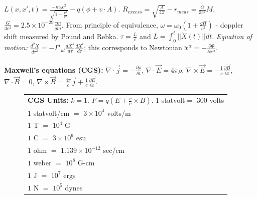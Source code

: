 $L(x,x',t)= {\frac {-m_0 c^2} {\sqrt {1-{\frac {v^2} {c^2}}}}} - q(\phi + v \cdot A)$.  
$R_{excess}= {\sqrt {\frac {A} {4 \pi}}} - r_{meas}= {\frac {G} {3 c^2}}M$,
${\frac {G} {3 c^2}}= 2.5 \times 10^{-29} {\frac {cm} {gm}}$.  From principle of
equivalence, $\omega= \omega_0 (1+ {\frac {gH} {c^2}})$ - doppler shift measured by 
Pound and Rebka. $\tau = {\frac L c}$ and $L = \int_0^t ||\dot{X}(t)|| dt$.
\emph{Equation of motion:} ${\frac {d^2 X} {{d \tau}^2}} = - {{\Gamma}^i}_{kl}
{\frac {d X^k} {d \tau}} {\frac {d X^l} {d \tau}}$; this corresponds to Newtonian
$\ddot{x}^{\alpha} = - {\frac {\partial \Phi} {\partial x^{\alpha}}}$.  
\\
\\
{\bf Maxwell's equations (CGS):}
$\nabla \cdot {\vec j} = - {\frac {\partial \rho} {\partial t}}$,
$\nabla \cdot {\vec E} =  4 \pi {\rho}$, 
$\nabla \times {\vec E} = - {\frac 1 c} {\frac {\partial {\vec B}}{\partial t}}$,
$\nabla \cdot {\vec B} = 0$,
$\nabla \times {\vec B} = {\frac {4 \pi} c} {\vec j} +
{\frac 1 c} {\frac {\partial {\vec E}} {\partial t}}$.
\begin{figure} [h]
\begin{center}
\begin{tabular} {|l|}
\hline
{\bf CGS Units:} $k=1$.  $F= q(E + {\frac v c} \times B)$.  
$1$ statvolt$=$ $300$ volts\\
$1$ statvolt/cm $=$ $3 \times 10^4$ volts/m\\
$1$ T $=$ $10^4$ G\\
$1$ C $=$ $3 \times 10^9$ esu\\
$1$ ohm $=$ $1.139 \times 10^{-12}$ sec/cm\\
$1$ weber $=$ $10^{8}$ G-cm\\
$1$ J $=$ $10^{7}$ ergs\\
$1$ N $=$ $10^{5}$ dynes\\
\hline
\end{tabular}
\end{center}
\end{figure}

